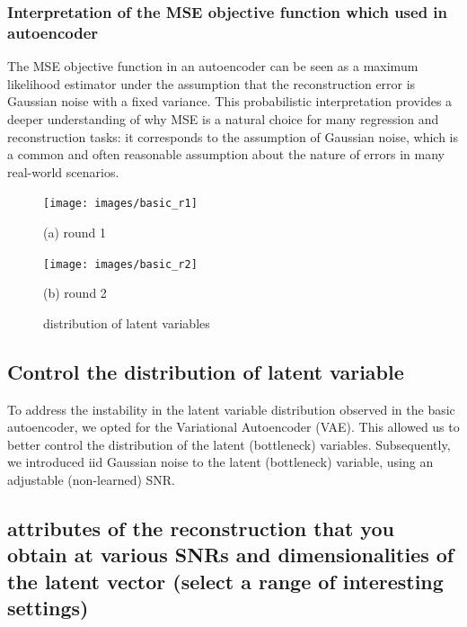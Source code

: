 \documentclass{article}
\begin{document}
\subsubsection{Interpretation of the MSE objective function which used in autoencoder}
\label{sssec:mse}
The MSE objective function in an autoencoder can be seen as a maximum likelihood estimator under the assumption that the reconstruction error is Gaussian noise with a fixed variance. This probabilistic interpretation provides a deeper understanding of why MSE is a natural choice for many regression and reconstruction tasks: it corresponds to the assumption of Gaussian noise, which is a common and often reasonable assumption about the nature of errors in many real-world scenarios.

\begin{figure}[htb]
  \begin{minipage}[b]{1.0\linewidth}
    \centering
    \centerline{\texttt{[image: images/basic\_r1]}}
    \centerline{(a) round 1}\medskip
  \end{minipage}
  \hfill
  \begin{minipage}[b]{1.0\linewidth}
    \centering
    \centerline{\texttt{[image: images/basic\_r2]}}
    \centerline{(b) round 2 }\medskip
  \end{minipage}
  \caption{distribution of latent variables}
  \label{fig:basic}
  \end{figure}

\subsection{Control the distribution of latent variable}
\label{ssec:VAE}

To address the instability in the latent variable distribution observed in the basic autoencoder, we opted for the Variational Autoencoder (VAE). This allowed us to better control the distribution of the latent (bottleneck) variables. Subsequently, we introduced iid Gaussian noise to the latent (bottleneck) variable, using an adjustable (non-learned) SNR.
\subsection{attributes of the reconstruction that you obtain at various SNRs and dimensionalities of the latent vector (select a range of interesting settings)}
\label{ssec:discuss}
\end{document}
